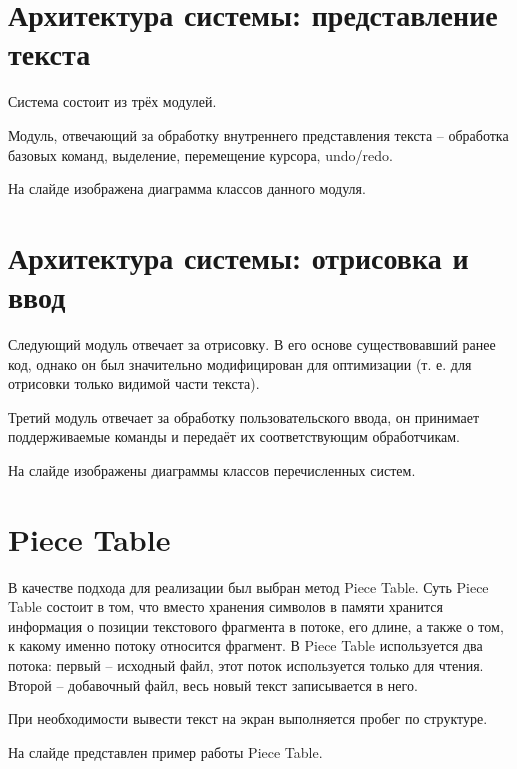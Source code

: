 \documentclass{article}
\begin{document}
    \section{Архитектура системы: представление текста}
        \par Система состоит из трёх модулей.
        \par Модуль, отвечающий за обработку внутреннего представления текста – обработка 
        базовых команд, выделение, перемещение курсора, undo/redo.
        \par На слайде изображена диаграмма классов данного модуля.
    \section{Архитектура системы: отрисовка и ввод}
        \par Следующий модуль отвечает за отрисовку. В его основе существовавший ранее код, 
        однако он был значительно модифицирован для оптимизации (т. е. для отрисовки только 
        видимой части текста).
        \par Третий модуль отвечает за обработку пользовательского ввода, он принимает 
        поддерживаемые команды и передаёт их соответствующим обработчикам.
        \par На слайде изображены диаграммы классов перечисленных систем.
    \section{Piece Table}
        \par В качестве подхода для реализации был выбран метод Piece Table. Суть Piece Table 
        состоит в том, что вместо хранения символов в памяти хранится информация о позиции 
        текстового фрагмента в потоке, его длине, а также о том, к какому именно потоку 
        относится фрагмент. В Piece Table используется два потока: первый – исходный файл, этот 
        поток используется только для чтения. Второй – добавочный файл, весь новый текст 
        записывается в него.
        \par При необходимости вывести текст на экран выполняется пробег по структуре.
        \par На слайде представлен пример работы Piece Table.
\end{document}
